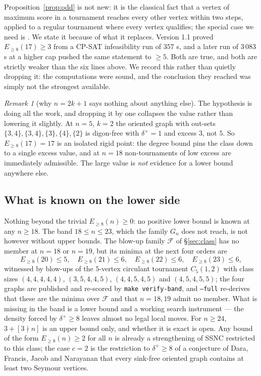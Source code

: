 \documentclass[11pt]{amsart}
\theoremstyle{remark}
\newtheorem{remark}[theorem]{Remark}
\begin{document}
Proposition~\ref{prop:odd} is not new: it is the classical fact that a vertex
of maximum score in a tournament reaches every other vertex within two steps,
applied to a regular tournament where every vertex qualifies; the special case
we need is \cite[Lem.~2.2]{GuoKangZwaneveld2026}. We state it because of what
it replaces. Version 1.1 proved $E_{\ge 8}(17) \ge 3$ from a CP-SAT
infeasibility run of $357$ s, and a later run of $3\,083$ s at a higher cap
pushed the same statement to $\ge 5$. Both are true, and both are strictly
weaker than the six lines above. We record this rather than quietly dropping
it: the computations were sound, and the conclusion they reached was simply
not the strongest available.

\begin{remark}[why $n = 2k+1$ says nothing about anything else]
The hypothesis is doing all the work, and dropping it by one collapses the
value rather than lowering it slightly. At $n = 5$, $k = 2$ the oriented graph
with out-sets $\{3,4\}, \{3,4\}, \{3\}, \{4\}, \{2\}$ is digon-free with
$\delta^+ = 1$ and excess $3$, not $5$. So $E_{\ge 8}(17) = 17$ is an
isolated rigid point: the degree bound pins the class down to a single excess
value, and at $n = 18$ non-tournaments of low excess are immediately
admissible. The large value is \emph{not} evidence for a lower bound anywhere
else.
\end{remark}

\subsection{What is known on the lower side}

Nothing beyond the trivial $E_{\ge 8}(n) \ge 0$: no positive lower bound is
known at any $n \ge 18$. The band $18 \le n \le 23$, which the family $G_n$
does not reach, is not however without upper bounds. The blow-up family
$\mathcal{F}$ of \S\ref{sec:class} has no member at $n = 18$ or $n = 19$, but
its minima at the next four orders are
\[
E_{\ge 8}(20) \le 5, \quad E_{\ge 8}(21) \le 6, \quad
E_{\ge 8}(22) \le 6, \quad E_{\ge 8}(23) \le 6,
\]
witnessed by blow-ups of the $5$-vertex circulant tournament $C_5(1,2)$ with
class sizes $(4,4,4,4,4)$, $(3,5,4,4,5)$, $(4,4,5,4,5)$ and $(4,5,4,5,5)$;
the four graphs are published and re-scored by \texttt{make verify-band}, and
\texttt{--full} re-derives that these are the minima over $\mathcal{F}$ and
that $n = 18, 19$ admit no member. What is missing in the band is a lower
bound and a working search instrument --- the density forced by
$\delta^+ \ge 8$ leaves almost no legal local moves. For
$n \ge 24$, $3 + [3\nmid n]$ is an upper bound only, and whether it is exact
is open. Any bound of the form $E_{\ge 8}(n) \ge 2$ for all $n$ is
already a strengthening of SSNC restricted to this class; the case
$c = 2$ is the restriction to $\delta^+ \ge 8$ of a conjecture of Dara,
Francis, Jacob and Narayanan \cite{DaraFrancisJacobNarayanan2022} that every
sink-free oriented graph contains at least two Seymour vertices.
\end{document}
